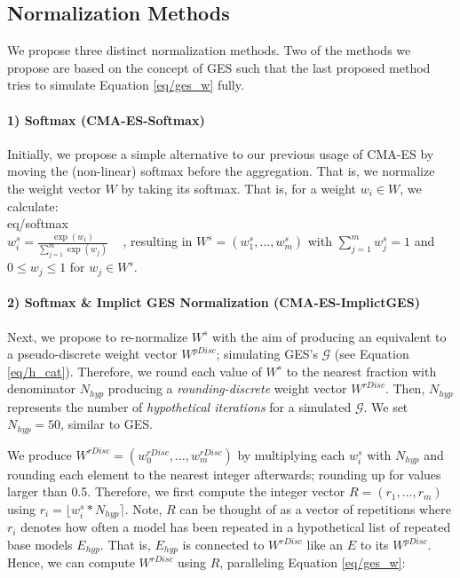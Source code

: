 \documentclass[11pt]{article}
\makeatletter
\newcommand{\nbc}[3]{
		{\colorbox{#3}{\bfseries\sffamily\scriptsize\textcolor{white}{#1}}}
		{\textcolor{#3}{\sf\small$\blacktriangleright$\textit{#2}$\blacktriangleleft$}}
}
\newcommand{\changed}[1]{\nbc{CHANGED}{#1}{changedcolor}}
\renewcommand{\changed}[1]{{\color{changedcolor}#1}}
\renewcommand{\changed}[1]{{#1}}
\newcommand*{\inlineequation}[2][]{%
  \begingroup
    \refstepcounter{equation}%
    \ifx\\#1\\%
    \else
      \label{#1}%
    \fi
    \relpenalty=10000 %
    \binoppenalty=10000 %
    \ensuremath{%
      #2%
    }%
    ~\@eqnnum
  \endgroup
}
\makeatother
\begin{document}
\subsection{Normalization Methods}

We propose three distinct normalization methods. Two of the methods we propose are based on the concept of GES such that the last proposed method tries to simulate Equation \ref{eq/ges_w} fully. 

\paragraph{1) Softmax (CMA-ES-Softmax)} Initially, we propose a simple alternative to our previous usage of CMA-ES by moving the (non-linear) softmax before the aggregation. That is, we normalize the weight vector $W$ by taking its softmax. \changed{That is, for a weight $w_i \in W$, we calculate:
\inlineequation[eq/softmax]{w_i^{s} = \frac{\exp(w_i)}{\sum^m_{j=1} \exp(w_j)}},
resulting in $W^{s} = (w_1^{s},..., w_m^{s})$ } with $\sum_{j=1}^m w^{s}_j = 1$ and $0 \leq w_j \leq 1$ for $w_j \in W^{s}$.  

\paragraph{2) Softmax \& Implict GES Normalization (CMA-ES-ImplictGES)} Next, we propose to re-normalize $W^{s}$ with the aim of producing an equivalent to a pseudo-discrete weight vector $W^{pDisc}$; simulating GES's $\mathcal{G}$ (see Equation \ref{eq/h_cat}). 
Therefore, we round each value of $W^{s}$ to the nearest fraction with denominator $N_{hyp}$ producing a \emph{rounding-discrete} weight vector $W^{rDisc}$.
Then, $N_{hyp}$ represents the number of \emph{hypothetical iterations} for a simulated $\mathcal{G}$. We set $N_{hyp} = 50$, similar to GES.

We produce \changed{$W^{rDisc} = (w_0^{rDisc}, ..., w_m^{rDisc})$} by multiplying each $w_i^{s}$ with $N_{hyp}$ and rounding each element to the nearest integer afterwards; rounding up for values larger than 0.5. \changed{Therefore, we first compute the integer vector $R = (r_1, ..., r_m)$ using $r_i = \lfloor w_i^{s} * N_{hyp}\rceil$.
Note, $R$ can be thought of as a vector of repetitions where $r_i$ denotes} how often a model has been repeated in a hypothetical list of repeated base models $E_{hyp}$.
That is, $E_{hyp}$ is connected to $W^{rDisc}$ like an $E$ to its $W^{pDisc}$. 
Hence, we can compute $W^{rDisc}$ using $R$, paralleling Equation \ref{eq/ges_w}: 
\end{document}
